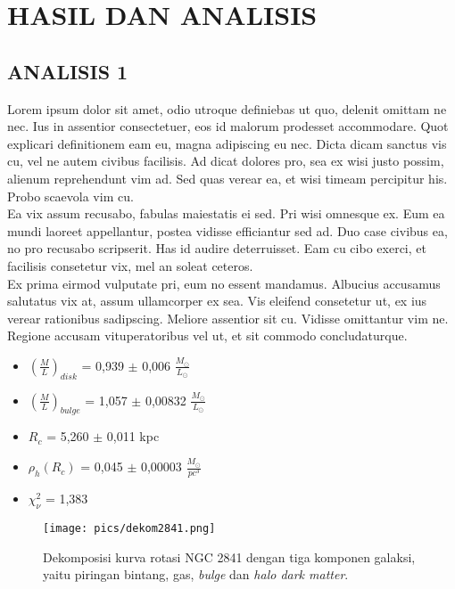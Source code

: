 \chapter{HASIL DAN ANALISIS}
\vspace{1.0cm}

\section{ANALISIS 1}
Lorem ipsum dolor sit amet, odio utroque definiebas ut quo, delenit omittam ne nec. Ius in assentior consectetuer, eos id malorum prodesset accommodare. Quot explicari definitionem eam eu, magna adipiscing eu nec. Dicta dicam sanctus vis cu, vel ne autem civibus facilisis. Ad dicat dolores pro, sea ex wisi justo possim, alienum reprehendunt vim ad. Sed quas verear ea, et wisi timeam percipitur his. Probo scaevola vim cu. \\

Ea vix assum recusabo, fabulas maiestatis ei sed. Pri wisi omnesque ex. Eum ea mundi laoreet appellantur, postea vidisse efficiantur sed ad. Duo case civibus ea, no pro recusabo scripserit. Has id audire deterruisset. Eam cu cibo exerci, et facilisis consetetur vix, mel an soleat ceteros.\\

Ex prima eirmod vulputate pri, eum no essent mandamus. Albucius accusamus salutatus vix at, assum ullamcorper ex sea. Vis eleifend consetetur ut, ex ius verear rationibus sadipscing. Meliore assentior sit cu. Vidisse omittantur vim ne. Regione accusam vituperatoribus vel ut, et sit commodo concludaturque.\\
\begin{itemize}
\item $(\frac{M}{L})_{disk}$ = 0,939 $\pm$ 0,006 $\frac{M_{\odot}}{L_{\odot}}$
\item $(\frac{M}{L})_{bulge}$ = 1,057 $\pm$ 0,00832 $\frac{M_{\odot}}{L_{\odot}}$
\item $R_{c}$ = 5,260 $\pm$ 0,011 kpc
\item $\rho_{h}(R_{c})$ = 0,045 $\pm$ 0,00003 $\frac{M_{\odot}}{pc^{3}}$
\item $\chi_{\nu}^{2}$ = 1,383 
\end{itemize}
\begin{figure}[H]
\centering 
\texttt{[image: pics/dekom2841.png]}
\caption[Plot Kurva Rotasi Galaksi NGC 2841 tanpa Medan Magnet]{Dekomposisi kurva rotasi NGC 2841 dengan tiga komponen galaksi, yaitu piringan bintang, gas, \textit{bulge} dan \textit{halo dark matter}.}
\label{fig:ngc2841}
\end{figure}

